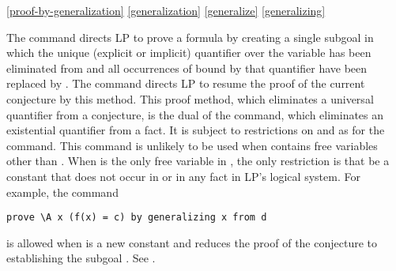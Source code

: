 \ref{proof-by-generalization}
\ref{generalization}
\ref{generalize}
\ref{generalizing}

The command  directs LP to prove a formula
 by creating a single subgoal in which the unique
 (explicit or implicit) 
 quantifier over the variable 
 has been eliminated from  and all occurrences of  bound by 
that quantifier have been replaced by .  
\p
The command  directs LP to resume the proof
of the current conjecture by this method.
\p
This proof method, which eliminates a universal quantifier from a conjecture,
is the dual of the  command, which eliminates an existential
quantifier from a fact.  It is subject to restrictions on  and  as
for the  command.
\p
This command is unlikely to be used when  contains free variables other
than .  When  is the only free variable in , the only
restriction is that  be a constant that does not occur in  or in
any fact in LP's logical system.  For example, the command
\begin{verbatim}
prove \A x (f(x) = c) by generalizing x from d
\end{verbatim}
is allowed when  is a new constant and reduces the proof of the
conjecture to establishing the subgoal .  See
.
